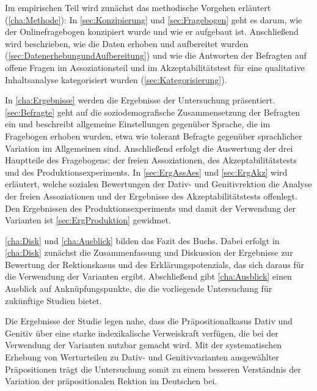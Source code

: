 Im empirischen Teil wird zunächst das methodische Vorgehen erläutert (\autoref{cha:Methode}): 
In \autoref{sec:Konzipierung} und \autoref{sec:Fragebogen} geht es darum, wie der Onlinefragebogen konzipiert wurde und wie er aufgebaut ist. 
Anschließend wird beschrieben, wie die Daten erhoben und aufbereitet wurden (\autoref{sec:DatenerhebungundAufbereitung}) und wie die Antworten der Befragten auf offene Fragen im Assoziationsteil und im Akzeptabilitätstest für eine qualitative Inhaltsanalyse kategorisiert wurden (\autoref{sec:Kategorisierung}). 

In \autoref{cha:Ergebnisse} werden die Ergebnisse der Untersuchung präsentiert. 
\autoref{sec:Befragte} geht auf die soziodemografische Zusammensetzung der Befragten ein und beschreibt allgemeine Einstellungen gegenüber Sprache, die im Fragebogen erhoben wurden, etwa wie tolerant Befragte gegenüber sprachlicher Variation im Allgemeinen sind. 
Anschließend erfolgt die Auswertung der drei Hauptteile des Fragebogens: der freien Assoziationen, des Akzeptabilitätstests und des Produktionsexperiments. 
In \autoref{sec:ErgAssAes} und \autoref{sec:ErgAkz} wird erläutert, welche sozialen Bewertungen der Dativ- und Genitivrektion die Analyse der freien Assoziationen und der Ergebnisse des Akzeptabilitätstests offenlegt.  
Den Ergebnissen des Produktionsexperiments und damit der Verwendung der Varianten ist \autoref{sec:ErgProduktion} gewidmet. 

\autoref{cha:Disk} und \autoref{cha:Ausblick} bilden das Fazit des Buchs.
Dabei erfolgt in \autoref{cha:Disk} zunächst die Zusammenfassung und Diskussion der Ergebnisse zur Bewertung der Rektionskasus und des Erklärungspotenzials, das sich daraus für die Verwendung der Varianten ergibt. 
Abschließend gibt \autoref{cha:Ausblick} einen Ausblick auf Anknüpfungspunkte, die die vorliegende Untersuchung für zukünftige Studien bietet. 

Die Ergebnisse der Studie legen nahe, dass die Präpositionalkasus Dativ und Genitiv über eine starke indexikalische Verweiskraft verfügen, die bei der Verwendung der Varianten nutzbar gemacht wird.  
Mit der systematischen Erhebung von Werturteilen zu Dativ- und Genitivvarianten ausgewählter Präpositionen trägt die Untersuchung somit zu einem besseren Verständnis der Variation %
der präpositionalen Rektion im Deutschen bei.
